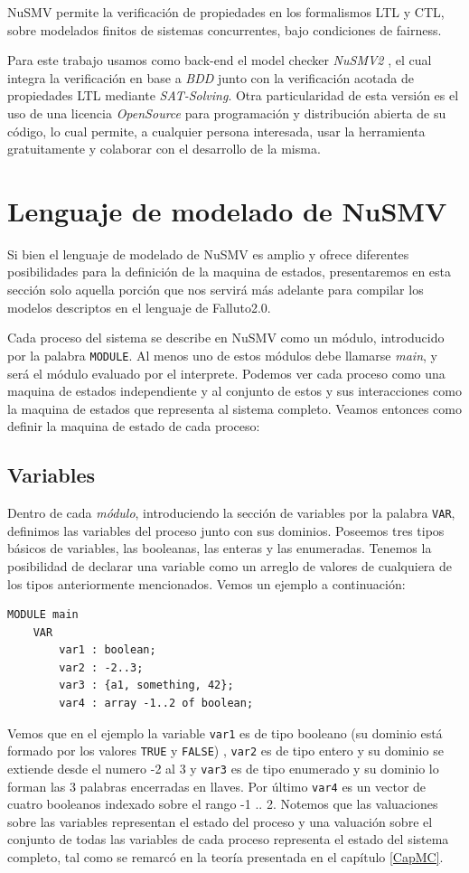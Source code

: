 \documentclass[titlepage, 12pt]{book}
\begin{document}
NuSMV permite la verificaci\'on de propiedades en los formalismos LTL y CTL, sobre modelados finitos de sistemas concurrentes, bajo condiciones de fairness.

Para este trabajo usamos como back-end el model checker \textit{NuSMV2} \cite{NuSMV2}, el cual integra la verificaci\'on en base a \textit{BDD} junto con la verificaci\'on acotada de propiedades LTL mediante \textit{SAT-Solving}. Otra particularidad de esta versi\'on es el uso de una licencia \textit{OpenSource} para programaci\'on y distribuci\'on abierta de su c\'odigo, lo cual permite, a cualquier persona interesada, usar la herramienta gratuitamente y colaborar con el desarrollo de la misma.


\section{Lenguaje de modelado de NuSMV}
Si bien el lenguaje de modelado de NuSMV es amplio y ofrece diferentes posibilidades para la definici\'on de la maquina de estados, presentaremos en esta secci\'on solo aquella porci\'on que nos servir\'a m\'as adelante para compilar los modelos descriptos en el lenguaje de Falluto2.0.

Cada proceso del sistema se describe en NuSMV como un m\'odulo, introducido por la palabra \texttt{MODULE}. Al menos uno de estos m\'odulos debe llamarse \textit{main}, y ser\'a el m\'odulo evaluado por el interprete. Podemos ver cada proceso como una maquina de estados independiente y al conjunto de estos y sus interacciones como la maquina de estados que representa al sistema completo. Veamos entonces como definir la maquina de estado de cada proceso:

\subsection*{Variables}

Dentro de cada \textit{m\'odulo}, introduciendo la secci\'on de variables por la palabra \texttt{VAR}, definimos las variables del proceso junto con sus dominios. Poseemos tres tipos b\'asicos de variables, las booleanas, las enteras y las enumeradas. Tenemos la posibilidad de declarar una variable como un arreglo de valores de cualquiera de los tipos anteriormente mencionados. Vemos un ejemplo a continuaci\'on:
\begin{verbatim}
MODULE main
    VAR
        var1 : boolean;
        var2 : -2..3;
        var3 : {a1, something, 42};
        var4 : array -1..2 of boolean;
\end{verbatim}
Vemos que en el ejemplo la variable \texttt{var1} es de tipo booleano (su dominio est\'a formado por los valores \texttt{TRUE} y \texttt{FALSE}) , \texttt{var2} es de tipo entero y su dominio se extiende desde el numero -2 al 3 y \texttt{var3} es de tipo enumerado y su dominio lo forman las 3 palabras encerradas en llaves. Por \'ultimo \texttt{var4} es un vector de cuatro booleanos indexado sobre el rango -1 .. 2. Notemos que las valuaciones sobre las variables representan el estado del proceso y una valuaci\'on sobre el conjunto de todas las variables de cada proceso representa el estado del sistema completo, tal como se remarc\'o en la teor\'ia presentada en el cap\'itulo \ref{CapMC}.
\end{document}
